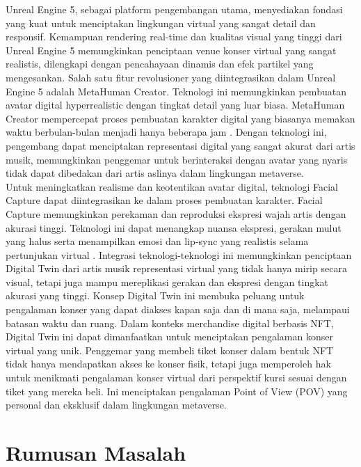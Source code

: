 Unreal Engine 5, sebagai platform pengembangan utama, menyediakan fondasi yang kuat untuk menciptakan lingkungan
virtual yang sangat detail dan responsif. Kemampuan rendering real-time dan kualitas visual yang tinggi
dari Unreal Engine 5 memungkinkan penciptaan venue konser virtual yang sangat realistis, dilengkapi dengan
pencahayaan dinamis dan efek partikel yang mengesankan. Salah satu fitur revolusioner yang diintegrasikan
dalam Unreal Engine 5 adalah MetaHuman Creator. Teknologi ini memungkinkan pembuatan avatar digital
hyperrealistic dengan tingkat detail yang luar biasa. MetaHuman Creator mempercepat proses pembuatan
karakter digital yang biasanya memakan waktu berbulan-bulan menjadi hanya beberapa jam \parencite{EpicGames2021}. Dengan
teknologi ini, pengembang dapat menciptakan representasi digital yang sangat akurat dari artis musik,
memungkinkan penggemar untuk berinteraksi dengan avatar yang nyaris tidak dapat dibedakan dari artis aslinya
dalam lingkungan metaverse.
\\

Untuk meningkatkan realisme dan keotentikan avatar digital, teknologi Facial Capture dapat diintegrasikan ke dalam
proses pembuatan karakter. Facial Capture memungkinkan perekaman dan reproduksi ekspresi wajah artis dengan akurasi
tinggi. Teknologi ini dapat menangkap nuansa ekspresi, gerakan mulut yang halus serta menampilkan emosi dan lip-sync
yang realistis selama pertunjukan virtual \parencite{Zeng2020}. Integrasi teknologi-teknologi ini memungkinkan penciptaan Digital
Twin dari artis musik \- representasi virtual yang tidak hanya mirip secara visual, tetapi juga mampu mereplikasi
gerakan dan ekspresi dengan tingkat akurasi yang tinggi. Konsep Digital Twin ini membuka peluang untuk pengalaman
konser yang dapat diakses kapan saja dan di mana saja, melampaui batasan waktu dan ruang. Dalam konteks merchandise digital
berbasis NFT, Digital Twin ini dapat dimanfaatkan untuk menciptakan pengalaman konser virtual yang unik. Penggemar yang
membeli tiket konser dalam bentuk NFT tidak hanya mendapatkan akses ke konser fisik, tetapi juga memperoleh hak untuk
menikmati pengalaman konser virtual dari perspektif kursi sesuai dengan tiket yang mereka beli. Ini menciptakan pengalaman
Point of View (POV) yang personal dan eksklusif dalam lingkungan metaverse.



\section{Rumusan Masalah}

